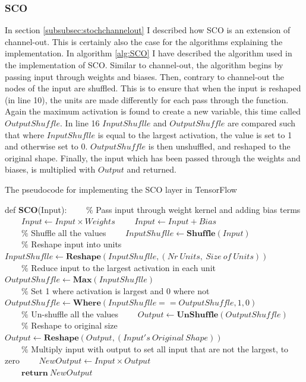 \subsubsection*{SCO}
In section \ref{subsubsec:stochchannelout} I described how \ac{SCO} is an extension of channel-out. This is certainly
also the case for the algorithms explaining the implementation. In algorithm \ref{alg:SCO} I have described the
algorithm used in the implementation of \ac{SCO}. Similar to channel-out, the algorithm begins by 
passing input through weights and biases. Then, contrary to channel-out the nodes of the input are shuffled. This 
is to ensure that when the input is reshaped (in line 10), the units are made differently for each pass through 
the function. Again the maximum activation is found to create a new variable, this time called $OutputShuffle$. 
In line 16 $InputShuflle$ and $OutputShuffle$ are compared such that where $InputShuflle$ is equal to the largest 
activation, the value is set to 1 and otherwise set to 0. $OutputShuffle$ is then unshuffled, and reshaped to the 
original shape. Finally, the input which has been passed through the weights and biases, is multiplied with 
$Output$ and returned.
\begin{algorithm}
    \caption{The pseudocode for implementing the SCO layer in TensorFlow}\label{alg:SCO}
    \begin{algorithmic}[1]
    \State def \textbf{SCO}(Input): 
    \State \ \ \ \ $\%$ Pass input through weight kernel and adding bias terms
    \State \ \ \ \ $Input \gets Input \times Weights$
    \State \ \ \ \ $Input \gets Input + Bias$
    \\
    \State \ \ \ \ $\%$ Shuffle all the values
    \State \ \ \ \ $InputShuflle \gets \textbf{Shuffle}(Input)$
    \\
    \State \ \ \ \ $\%$ Reshape input into units
    \State \ \ \ \ $InputShuflle \gets \textbf{Reshape}(InputShuflle,(Nr\ Units,\ Size \ of \ Units))$
    \\
    \State \ \ \ \ $\%$ Reduce input to the largest activation in each unit
    \State \ \ \ \ $OutputShuffle \gets \textbf{Max}(InputShuflle)$
    \\
    \State \ \ \ \ $\%$ Set 1 where activation is largest and 0 where not
    \State \ \ \ \ $OutputShuffle \gets \textbf{Where}(InputShuflle == OutputShuffle, 1,0)$
    \\
    \State \ \ \ \ $\%$ Un-shuffle all the values
    \State \ \ \ \ $Output \gets \textbf{UnShuffle}(OutputShuffle)$
    \\
    \State \ \ \ \ $\%$ Reshape to original size
    \State \ \ \ \ $Output \gets \textbf{Reshape}(Output,(Input's \ Original \ Shape))$
    \\
    \State \ \ \ \ $\%$ Multiply input with output to set all input that are not the largest, to zero
    \State \ \ \ \ $NewOutput \gets Input \times Output$
    \\
    \State \ \ \ \ $\textbf{return}\ NewOutput$
    \end{algorithmic}
\end{algorithm}
